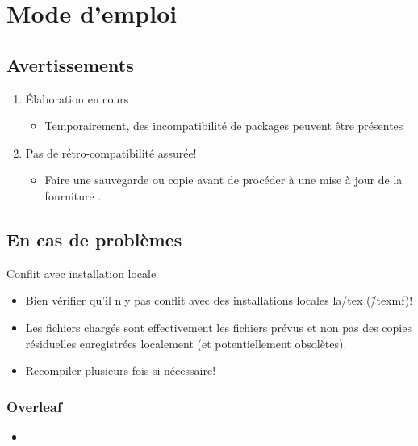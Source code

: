 \newcommand{\CTAN}[1]{\textsl{#1}}

\chapter{Mode d'emploi}

\section{Avertissements}

{\huge\color{red}
\begin{enumerate}
\item Élaboration en cours
  \begin{itemize}
  \item Temporairement, des incompatibilité de packages peuvent être présentes
  \end{itemize}
\item Pas de rétro-compatibilité assurée!
  \begin{itemize}
  \item Faire une sauvegarde ou copie avant de procéder à une mise à jour de la fourniture \UGE.
  \end{itemize}
\end{enumerate}
}

\section{En cas de problèmes}

\begin{Attention}{Conflit avec installation locale}
  \begin{itemize}
  \item Bien vérifier qu'il n'y pas conflit avec des installations locales la/tex  (\~/texmf)!
  \item Les fichiers chargés sont effectivement les fichiers prévus et non pas des copies résiduelles enregistrées localement (et potentiellement obsolètes).
  \end{itemize}
\end{Attention}


\begin{itemize}
\item Recompiler plusieurs fois si nécessaire!
\end{itemize}

\subsection{Overleaf}
\begin{itemize}
\item \url{}
\end{itemize}

